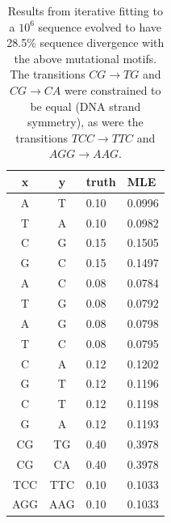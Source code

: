\documentclass{article}
\newcommand{\nA}{\mbox{A}}  %
\newcommand{\nC}{\mbox{C}}
\newcommand{\nG}{\mbox{G}}
\newcommand{\nT}{\mbox{T}}
\theoremstyle{plain}
\theoremstyle{definition}
\begin{document}

\begin{table}
  \begin{center}
        \begin{tabular}{c@{\quad$\to$\quad}c@{\quad at rate\quad }ll}
          \hline
            x & y & truth & MLE \\
          \hline
          \nA  &   \nT           & 0.10 & 0.0996 \\
          \nT  &   \nA           & 0.10 & 0.0982 \\
          \nC  &   \nG           & 0.15 & 0.1505 \\
          \nG  &   \nC           & 0.15 & 0.1497 \\
          \nA  &   \nC           & 0.08 & 0.0784 \\
          \nT  &   \nG           & 0.08 & 0.0792 \\
          \nA  &   \nG           & 0.08 & 0.0798 \\
          \nT  &   \nC           & 0.08 & 0.0795 \\
          \nC  &   \nA           & 0.12 & 0.1202 \\
          \nG  &   \nT           & 0.12 & 0.1196 \\
          \nC  &   \nT           & 0.12 & 0.1198 \\
          \nG  &   \nA           & 0.12 & 0.1193 \\
       \nC\nG  &  \nT\nG         & 0.40 & 0.3978 \\
       \nC\nG  &  \nC\nA         & 0.40 & 0.3978 \\
    \nT\nC\nC  &  \nT\nT\nC      & 0.10 & 0.1033 \\
    \nA\nG\nG  &  \nA\nA\nG      & 0.10 & 0.1033 \\
           \hline
        \end{tabular}
  \end{center}
  \caption{ Results from iterative fitting to a $10^6$ sequence evolved to have 28.5\% sequence divergence
    with the above mutational motifs. The transitions $CG \to TG$ and $CG \to CA$
    were constrained to be equal (DNA strand symmetry),
    as were the transitions $TCC \to TTC$ and $AGG \to AAG$.
    \label{tab:cpg_results} }
\end{table}
\end{document}
